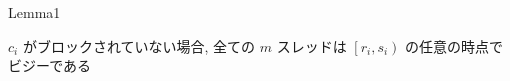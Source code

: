 \begin{frame}{Lemma1}
    \begin{lemma}[]
        $c_{i}$ がブロックされていない場合, 全ての $m$ スレッドは $\left[r_{i}, s_{i}\right)$ の任意の時点でビジーである
    \end{lemma}
\end{frame}







